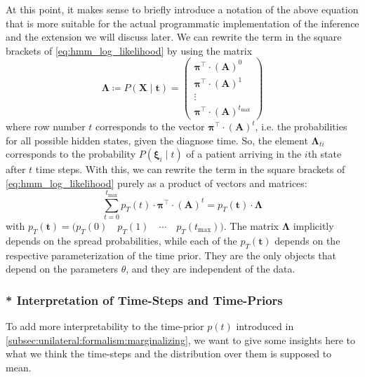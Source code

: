 \documentclass[\relativeRoot/main.tex]{subfiles}
\begin{document}
At this point, it makes sense to briefly introduce a notation of the above equation that is more suitable for the actual programmatic implementation of the inference and the extension we will discuss later. We can rewrite the term in the square brackets of \cref{eq:hmm_log_likelihood} by using the matrix
%
\begin{equation} \label{eq:hmm_matrix_lambda}
    \boldsymbol{\Lambda} \coloneqq 
    P \left( \mathbf{X} \mid \mathbf{t} \right) = 
    \begin{pmatrix}
        \boldsymbol{\pi}^\top \cdot \left( \mathbf{A} \right)^0 \\
        \boldsymbol{\pi}^\top \cdot \left( \mathbf{A} \right)^1 \\
        \vdots \\
        \boldsymbol{\pi}^\top \cdot \left( \mathbf{A} \right)^{t_\text{max}}
    \end{pmatrix}
\end{equation}
%
where row number $t$ corresponds to the vector $\boldsymbol{\pi}^\top \cdot \left( \mathbf{A} \right)^t$, i.e. the probabilities for all possible hidden states, given the diagnose time. So, the element $\boldsymbol{\Lambda}_{ti}$ corresponds to the probability $P \left( \boldsymbol{\xi}_i \mid t \right)$ of a patient arriving in the $i$th state after $t$ time steps. With this, we can rewrite the term in the square brackets of \cref{eq:hmm_log_likelihood} purely as a product of vectors and matrices:
%
\begin{equation}
    \sum_{t = 0}^{t_\text{max}}{p_T (t) \cdot \boldsymbol{\pi}^\top \cdot (\mathbf{A})^t} = p_T \left( \mathbf{t} \right) \cdot \boldsymbol{\Lambda}
\end{equation}
%
with $p_T \left( \mathbf{t} \right) = \big( p_T(0) \quad p_T(1) \quad \cdots \quad p_T(t_\text{max}) \big)$. The matrix $\boldsymbol{\Lambda}$ implicitly depends on the spread probabilities, while each of the $p_T(\mathbf{t})$ depends on the respective parameterization of the time prior. They are the only objects that depend on the parameters $\theta$, and they are independent of the data.


\subsubsection*{* Interpretation of Time-Steps and Time-Priors}
\label{subsubsec:unilateral:formalism:tstage:interpretation}

To add more interpretability to the time-prior $p(t)$ introduced in \cref{subsec:unilateral:formalism:marginalizing}, we want to give some insights here to what we think the time-steps and the distribution over them is supposed to mean.
\end{document}
